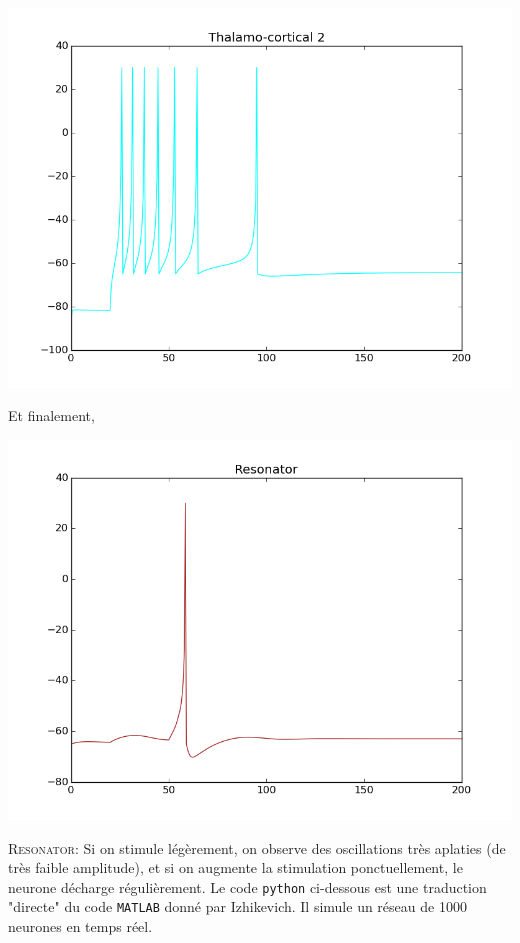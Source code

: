 \documentclass[10pt]{article}
\begin{document}
\begin{center}
\includegraphics[scale=0.5]{figure_6}
\end{center}
\justify
Et finalement,
\begin{center}
\includegraphics[scale=0.5]{figure_7}
\end{center}
\justify
\textsc{Resonator:} Si on stimule légèrement, on observe des oscillations très aplaties (de très faible amplitude), et si on augmente la stimulation ponctuellement, le neurone décharge régulièrement.
\justify
Le code \texttt{python} ci-dessous est une traduction "directe" du code \texttt{MATLAB} donn\'e par Izhikevich. Il simule un réseau de 1000 neurones en temps r\'eel.
\end{document}

